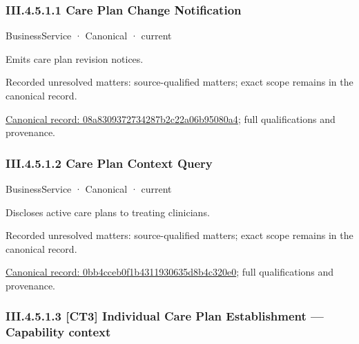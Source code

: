 \subsubsection*{III.4.5.1.1 Care Plan Change Notification}
\label{navigation:III.4.5.1.1}

\label{element:08a8309372734287b2c22a06b95080a4}
{\small BusinessService · Canonical · current}\par

Emits care plan revision notices.


{\small Recorded unresolved matters: source-qualified matters; exact scope remains in the canonical record.}\par
{\footnotesize \href{../../../../../../../../continuum/business/business-service/08a8309372734287b2c22a06b95080a4.md}{Canonical record: 08a8309372734287b2c22a06b95080a4}; full qualifications and provenance.}\par
\subsubsection*{III.4.5.1.2 Care Plan Context Query}
\label{navigation:III.4.5.1.2}

\label{element:0bb4cceb0f1b4311930635d8b4c320e0}
{\small BusinessService · Canonical · current}\par

Discloses active care plans to treating clinicians.


{\small Recorded unresolved matters: source-qualified matters; exact scope remains in the canonical record.}\par
{\footnotesize \href{../../../../../../../../continuum/business/business-service/0bb4cceb0f1b4311930635d8b4c320e0.md}{Canonical record: 0bb4cceb0f1b4311930635d8b4c320e0}; full qualifications and provenance.}\par
\subsubsection*{III.4.5.1.3 [CT3] Individual Care Plan Establishment — Capability context}
\label{navigation:III.4.5.1.3}

